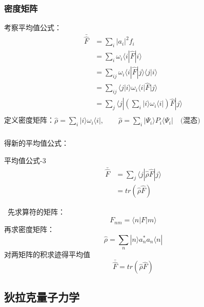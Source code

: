 \begin{frame}
    \frametitle{密度矩阵}
    考察平均值公式：\\
    $$ \begin{aligned}
    \bar{\hat{F}} &=\sum\limits_i |a_i|^2 f_i \\
            &=\sum\limits_i \omega_i \langle i |\hat{F}|i \rangle  \\
            &=\sum\limits_{ij} \omega_i \langle i |\hat{F} |j\rangle \langle j| i\rangle  \\
            &=\sum\limits_{ij} \langle j| i\rangle  \omega_i \langle i |\hat{F} |j\rangle  \\
            &=\sum\limits_{j} \langle j | (\sum\limits_{i}| i \rangle  \omega_i \langle i |) \hat{F} |j\rangle  \\
    \end{aligned} $$
    定义密度矩阵：$ \hat{\rho} = \sum\limits_{i}| i \rangle  \omega_i \langle i | , \qquad \hat{\rho} = \sum\limits_{i}| \Psi_i \rangle  P_i \langle \Psi_i | \quad \text{(混态)} $
\end{frame} 
 
\begin{frame}  
    \frametitle{}  得新的平均值公式：
    \begin{tcolorbox1}{平均值公式-3}
         $$ \begin{aligned}
            \bar{\hat{F}}&=\sum\limits_{j} \langle j | \hat{\rho} \hat{F} |j\rangle \\
                &=tr (\hat{\rho} \hat{F} )
        \end{aligned} $$   
    \end{tcolorbox1} 
\end{frame} 
 
\begin{frame}      
    \例[1.求算符$\hat{F}$在 $|\Psi\rangle =\sum\limits_n a_n |n\rangle $上的平均值]{}
    \解~先求算符的矩阵：
    $$ F_{nm} = \langle n | F |m \rangle  $$
    再求密度矩阵：
    $$ \hat{\rho} = \sum\limits_{n}| n \rangle  a_n ^* a_n \langle n | $$
    对两矩阵的积求迹得平均值
    $$\bar{\hat{F}}=tr (\hat{\rho} \hat{F} )$$
\end{frame} 
 
\subsection{狄拉克量子力学}

